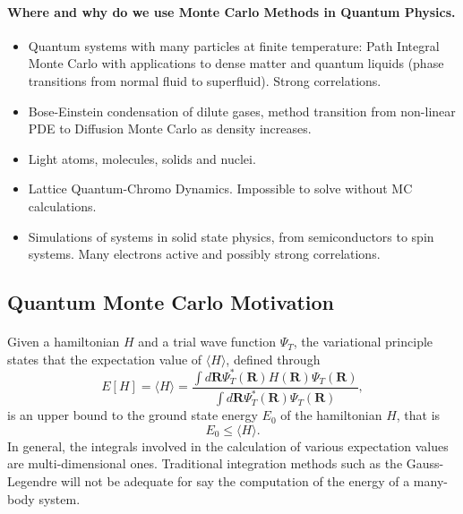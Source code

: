 \documentclass[%
twoside,                 %
final,                   %
10pt]{article}
\begin{document}
\paragraph{Where and why do we use Monte Carlo Methods in Quantum Physics.}
\begin{itemize}
\item Quantum systems with many particles at finite temperature: Path Integral Monte Carlo with applications to dense matter and quantum liquids (phase transitions from normal fluid to superfluid). Strong correlations.

\item Bose-Einstein condensation of dilute gases, method transition from  non-linear PDE to Diffusion Monte Carlo as density increases.

\item Light atoms, molecules, solids and nuclei. 

\item Lattice Quantum-Chromo Dynamics. Impossible to solve without MC calculations. 

\item Simulations of systems in solid state physics, from semiconductors to spin systems. Many electrons active and possibly strong correlations.
\end{itemize}

\noindent



\subsection{Quantum Monte Carlo Motivation}

\paragraph{}
Given a hamiltonian $H$ and a trial wave function $\Psi_T$, the variational principle states that the expectation value of $\langle H \rangle$, defined through 
\[
   E[H]= \langle H \rangle =
   \frac{\int d\bm{R}\Psi^{\ast}_T(\bm{R})H(\bm{R})\Psi_T(\bm{R})}
        {\int d\bm{R}\Psi^{\ast}_T(\bm{R})\Psi_T(\bm{R})},
\]
is an upper bound to the ground state energy $E_0$ of the hamiltonian $H$, that is 
\[
    E_0 \le \langle H \rangle .
\]
In general, the integrals involved in the calculation of various  expectation values  are multi-dimensional ones. Traditional integration methods such as the Gauss-Legendre will not be adequate for say the  computation of the energy of a many-body system.
\end{document}
